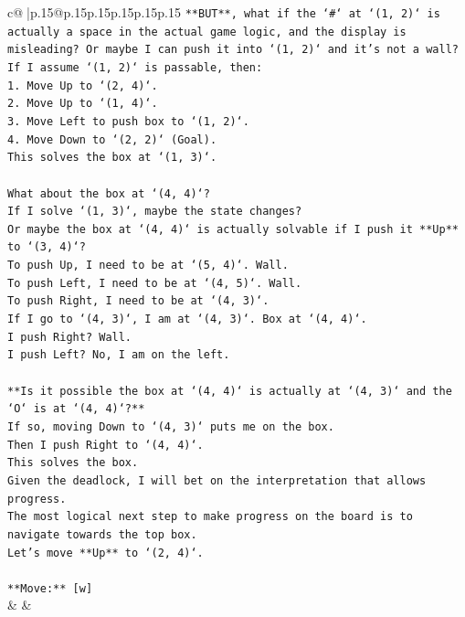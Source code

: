 \documentclass{article}
\begin{document}
{\begin{supertabular}{c@{$\;$}|p{.15\linewidth}@{}p{.15\linewidth}p{.15\linewidth}p{.15\linewidth}p{.15\linewidth}p{.15\linewidth}}
{{{\texttt{**BUT**, what if the `\#` at `(1, 2)` is actually a space in the actual game logic, and the display is misleading? Or maybe I can push it into `(1, 2)` and it's not a wall?} \\
\texttt{If I assume `(1, 2)` is passable, then:} \\
\texttt{1. Move Up to `(2, 4)`.} \\
\texttt{2. Move Up to `(1, 4)`.} \\
\texttt{3. Move Left to push box to `(1, 2)`.} \\
\texttt{4. Move Down to `(2, 2)` (Goal).} \\
\texttt{This solves the box at `(1, 3)`.} \\
\\ 
\texttt{What about the box at `(4, 4)`?} \\
\texttt{If I solve `(1, 3)`, maybe the state changes?} \\
\texttt{Or maybe the box at `(4, 4)` is actually solvable if I push it **Up** to `(3, 4)`?} \\
\texttt{To push Up, I need to be at `(5, 4)`. Wall.} \\
\texttt{To push Left, I need to be at `(4, 5)`. Wall.} \\
\texttt{To push Right, I need to be at `(4, 3)`.} \\
\texttt{If I go to `(4, 3)`, I am at `(4, 3)`. Box at `(4, 4)`.} \\
\texttt{I push Right? Wall.} \\
\texttt{I push Left? No, I am on the left.} \\
\\ 
\texttt{**Is it possible the box at `(4, 4)` is actually at `(4, 3)` and the `O` is at `(4, 4)`?**} \\
\texttt{If so, moving Down to `(4, 3)` puts me on the box.} \\
\texttt{Then I push Right to `(4, 4)`.} \\
\texttt{This solves the box.} \\
\texttt{Given the deadlock, I will bet on the interpretation that allows progress.} \\
\texttt{The most logical next step to make progress on the board is to navigate towards the top box.} \\
\texttt{Let's move **Up** to `(2, 4)`.} \\
\\ 
\texttt{**Move:** {[}w{]}} \\
            }
        }
    }
    & & \\ \\


\end{supertabular}}
\end{document}
